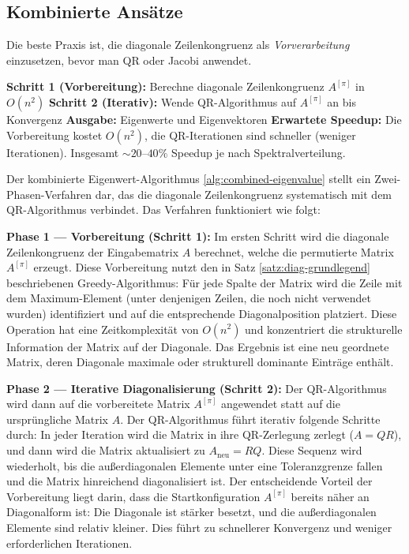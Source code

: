 \documentclass[a4paper,12pt]{article}
\theoremstyle{definition}
\begin{document}
\subsection{Kombinierte Ansätze}

Die beste Praxis ist, die diagonale Zeilenkongruenz als \emph{Vorverarbeitung} einzusetzen, bevor man QR oder Jacobi anwendet.

\begin{algorithm}
\caption{Kombinierter Eigenwert-Algorithmus}
\label{alg:combined-eigenvalue}
\begin{algorithmic}[1]
  \State \textbf{Schritt 1 (Vorbereitung):} Berechne diagonale Zeilenkongruenz $A^{[\pi]}$ in $O(n^2)$
  \State \textbf{Schritt 2 (Iterativ):} Wende QR-Algorithmus auf $A^{[\pi]}$ an bis Konvergenz
  \State \textbf{Ausgabe:} Eigenwerte und Eigenvektoren
  \Statex
  \Statex \textbf{Erwartete Speedup:} Die Vorbereitung kostet $O(n^2)$, die QR-Iterationen sind schneller (weniger Iterationen). Insgesamt $\sim 20$--$40\%$ Speedup je nach Spektralverteilung.
\end{algorithmic}
\end{algorithm}

Der kombinierte Eigenwert-Algorithmus \ref{alg:combined-eigenvalue} stellt ein Zwei-Phasen-Verfahren dar, das die diagonale Zeilenkongruenz systematisch mit dem QR-Algorithmus verbindet. Das Verfahren funktioniert wie folgt:

\textbf{Phase 1 — Vorbereitung (Schritt 1):} Im ersten Schritt wird die diagonale Zeilenkongruenz der Eingabematrix $A$ berechnet, welche die permutierte Matrix $A^{[\pi]}$ erzeugt. Diese Vorbereitung nutzt den in Satz \ref{satz:diag-grundlegend} beschriebenen Greedy-Algorithmus: Für jede Spalte der Matrix wird die Zeile mit dem Maximum-Element (unter denjenigen Zeilen, die noch nicht verwendet wurden) identifiziert und auf die entsprechende Diagonalposition platziert. Diese Operation hat eine Zeitkomplexität von $O(n^2)$ und konzentriert die strukturelle Information der Matrix auf der Diagonale. Das Ergebnis ist eine neu geordnete Matrix, deren Diagonale maximale oder strukturell dominante Einträge enthält.

\textbf{Phase 2 — Iterative Diagonalisierung (Schritt 2):} Der QR-Algorithmus wird dann auf die vorbereitete Matrix $A^{[\pi]}$ angewendet statt auf die ursprüngliche Matrix $A$. Der QR-Algorithmus führt iterativ folgende Schritte durch: In jeder Iteration wird die Matrix in ihre QR-Zerlegung zerlegt ($A = QR$), und dann wird die Matrix aktualisiert zu $A_{\text{neu}} = RQ$. Diese Sequenz wird wiederholt, bis die außerdiagonalen Elemente unter eine Toleranzgrenze fallen und die Matrix hinreichend diagonalisiert ist. Der entscheidende Vorteil der Vorbereitung liegt darin, dass die Startkonfiguration $A^{[\pi]}$ bereits näher an Diagonalform ist: Die Diagonale ist stärker besetzt, und die außerdiagonalen Elemente sind relativ kleiner. Dies führt zu schnellerer Konvergenz und weniger erforderlichen Iterationen.
\end{document}
